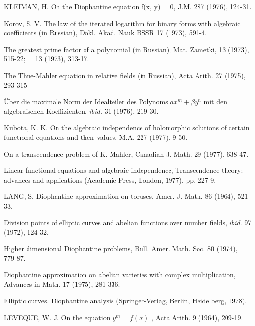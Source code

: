 \begin{hanglist}
    \item KLEIMAN, H. On the Diophantine equation f(x, y) = 0, J.M. 287 (1976), 124-31.
    \item Korov, S. V. The law of the iterated logarithm for binary forms with algebraic coefficients (in Russian), Dokl. Akad. Nauk BSSR 17 (1973), 591-4.
    \item \hspace{1.5em} The greatest prime factor of a polynomial (in Russian), Mat. Zametki, 13 (1973), 515-22; = 13 (1973), 313-17.
    \item \hspace{1.5em} The Thue-Mahler equation in relative fields (in Russian), Acta Arith. 27 (1975), 293-315.
    \item \hspace{1.5em} Über die maximale Norm der Idealteiler des Polynoms  $ax^m + \beta y^n$  mit den algebraischen Koeffizienten, \textit{ibid.} 31 (1976), 219-30.
    \item Kubota, K. K. On the algebraic independence of holomorphic solutions of certain functional equations and their values, M.A. 227 (1977), 9-50.
    \item \hspace{1.5em} On a transcendence problem of K. Mahler, Canadian J. Math. 29 (1977), 638-47.
    \item \hspace{1.5em} Linear functional equations and algebraic independence, Transcendence theory: advances and applications (Academic Press, London, 1977), pp. 227-9.
    \item LANG, S. Diophantine approximation on toruses, Amer. J. Math. 86 (1964), 521-33.
    \item Division points of elliptic curves and abelian functions over number fields, \textit{ibid}. 97 (1972), 124-32.
    \item Higher dimensional Diophantine problems, Bull. Amer. Math. Soc. 80 (1974), 779-87.
    \item Diophantine approximation on abelian varieties with complex multiplication, Advances in Math. 17 (1975), 281-336.
    \item Elliptic curves. Diophantine analysis (Springer-Verlag, Berlin, Heidelberg, 1978).
    \item LEVEQUE, W. J. On the equation  $y^m = f(x)$ , Acta Arith. 9 (1964), 209-19.

\end{hanglist}
